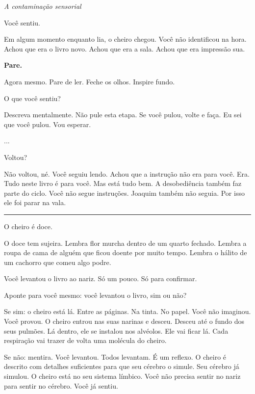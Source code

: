 
\noindent \textit{A contaminação sensorial}

\noindent Você sentiu.

\noindent Em algum momento enquanto lia, o cheiro chegou. Você não identificou na hora. Achou que era o livro novo. Achou que era a sala. Achou que era impressão sua.

\noindent \textbf{Pare.}

\noindent Agora mesmo. Pare de ler. Feche os olhos. Inspire fundo.

\noindent O que você sentiu?

\noindent Descreva mentalmente. Não pule esta etapa. Se você pulou, volte e faça. Eu sei que você pulou. Vou esperar.

\noindent ...

\noindent Voltou?

\noindent Não voltou, né. Você seguiu lendo. Achou que a instrução não era para você. Era. Tudo neste livro é para você. Mas está tudo bem. A desobediência também faz parte do ciclo. Você não segue instruções. Joaquim também não seguia. Por isso ele foi parar na vala.

\vspace{0.5em}\noindent\rule{\textwidth}{0.5pt}\vspace{0.5em}

\noindent O cheiro é doce.

\noindent O doce tem sujeira. Lembra flor murcha dentro de um quarto fechado. Lembra a roupa de cama de alguém que ficou doente por muito tempo. Lembra o hálito de um cachorro que comeu algo podre.

\noindent Você levantou o livro ao nariz. Só um pouco. Só para confirmar.

\noindent Aponte para você mesmo: você levantou o livro, sim ou não?

\noindent Se sim: o cheiro está lá. Entre as páginas. Na tinta. No papel. Você não imaginou. Você provou. O cheiro entrou nas suas narinas e desceu. Desceu até o fundo dos seus pulmões. Lá dentro, ele se instalou nos alvéolos. Ele vai ficar lá. Cada respiração vai trazer de volta uma molécula do cheiro.

\noindent Se não: mentira. Você levantou. Todos levantam. É um reflexo. O cheiro é descrito com detalhes suficientes para que seu cérebro o simule. Seu cérebro já simulou. O cheiro está no seu sistema límbico. Você não precisa sentir no nariz para sentir no cérebro. Você já sentiu.

